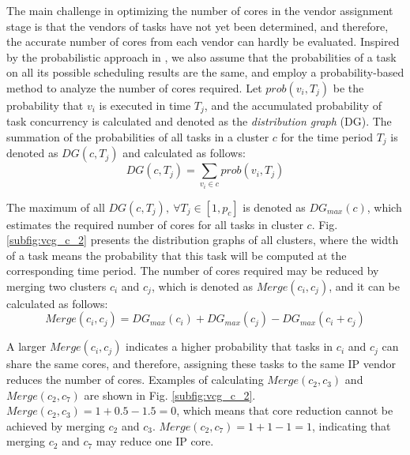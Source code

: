 \documentclass[10pt,journal, compsoc]{IEEEtran}
\begin{document}
The main challenge in optimizing the number of cores in the vendor assignment stage is that the vendors of tasks have not yet been determined, and therefore, the accurate number of cores from each vendor can hardly be evaluated. Inspired by the probabilistic approach in \cite{article:PP}, we also assume that the probabilities of a task on all its possible scheduling results are the same, and employ a probability-based method to analyze the number of cores required. Let $prob(v_i,T_j)$ be the probability that $v_i$ is executed in time $T_j$, and the accumulated probability of task concurrency is calculated and denoted as the \textit{distribution graph} (DG). The summation of the probabilities of all tasks in a cluster $c$ for the time period $T_j$ is denoted as $DG(c, T_j)$ and calculated as follows:
\begin{equation}
DG(c, T_j) = \sum \limits_{v_i\in c} prob(v_i, T_j)
\end{equation}



The maximum of all $DG(c, T_j), ~\forall T_j\in[1, p_c]$ is denoted as $DG_{max}(c)$, which estimates the required number of cores for all tasks in cluster $c$. Fig. \ref{subfig:vcg_c_2} presents the distribution graphs of all clusters, where the width of a task means the probability that this task will be computed at the corresponding time period. The number of cores required may be reduced by merging two clusters $c_i$ and $c_j$, which is denoted as $Merge(c_i, c_j)$, and it can be calculated as follows:
\begin{equation}
Merge(c_i, c_j) = DG_{max}(c_i) + DG_{max}(c_j) - DG_{max}(c_i+c_j)
\label{equ:weight_e2}
\end{equation}

A larger $Merge(c_i, c_j)$ indicates a higher probability that tasks in $c_i$ and $c_j$ can share the same cores, and therefore, assigning these tasks to the same IP vendor reduces the number of cores. Examples of calculating $Merge(c_2, c_3)$ and $Merge(c_2, c_7)$ are shown in Fig. \ref{subfig:vcg_c_2}. $Merge(c_2, c_3)=1+0.5-1.5=0$, which means that core reduction cannot be achieved by merging $c_2$ and $c_3$. $Merge(c_2, c_7)=1+1-1=1$, indicating that merging $c_2$ and $c_7$ may reduce one IP core.
\end{document}
